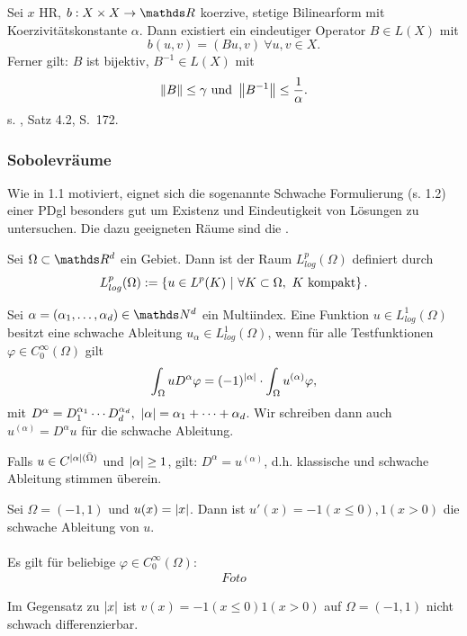 Sei $x$ HR, $b:X\times X\to\R$ koerzive, stetige Bilinearform mit Koerzivitätskonstante $\alpha$.
Dann existiert ein eindeutiger Operator $B\in L(X)$ mit
\[
b(u,v) = (Bu,v)~\forall u,v\in X.
\]
Ferner gilt: $B$ ist bijektiv, $B^{-1}\in L(X)$ mit
\[
\left\Vert B\right\Vert \le \gamma \text{ und } \left\Vert B^{-1}\right\Vert\le \frac{1}{\alpha}.
\]
 s. \cite{Alt06}, Satz 4.2, S.~172.

\subsubsection{Sobolevräume}

Wie in 1.1 motiviert, eignet sich die sogenannte Schwache Formulierung (s. 1.2) einer PDgl besonders gut um Existenz und Eindeutigkeit von Lösungen zu untersuchen.
Die dazu geeigneten Räume sind die .

Sei $\Omega\subset \R^d$ ein Gebiet.
Dann ist der Raum $L_{log}^p(\Omega)$ definiert durch 
\[
L_{log}^p(\Omega) := \left\{u\in L^p(K) ~|~ \forall K\subset \Omega,~ K\text{ kompakt}\right\}.
\]

Sei $\alpha = (\alpha_1\dt{,}\alpha_d)\in \N^d$ ein Multiindex.
Eine Funktion $u\in L_{log}^1(\Omega)$ besitzt eine schwache Ableitung $u_\alpha \in L_{log}^1(\Omega)$, wenn für alle Testfunktionen $\varphi\in C_0^\infty(\Omega)$ gilt
\[
\int_{\Omega} u D^\alpha \varphi = (-1)^{\left\vert\alpha\right\vert} \cdot \int_{\Omega} u^{(\alpha)} \varphi,
\]
mit $D^\alpha = D_1^{\alpha_1}\cdots D_d^{\alpha_d},~\left\vert\alpha\right\vert = \alpha_1 + \dots + \alpha_d$.
Wir schreiben dann auch $u^{(\alpha)} = D^\alpha u$ für die schwache Ableitung.

Falls $u\in C^{\left\vert\alpha\right\vert(\bar{\Omega})}$ und $\left\vert\alpha\right\vert\ge 1$, gilt: $D^\alpha= u^{(\alpha)}$, d.h. klassische und schwache Ableitung stimmen überein.

Sei $\Omega =(-1,1)$ und $u(x) =\left\vert x\right\vert$.
Dann ist $u'(x) = -1 (x\le 0), 1 (x> 0)$ die schwache Ableitung von $u$.\\

\\
Es gilt für beliebige $\varphi\in C_0^\infty(\Omega)$:
\begin{align*}
Foto
\end{align*}

Im Gegensatz zu $\left\vert x\right\vert$ ist $v(x)= -1 (x\le 0) 1 (x>0)$ auf $\Omega = (-1,1)$ nicht schwach differenzierbar.

